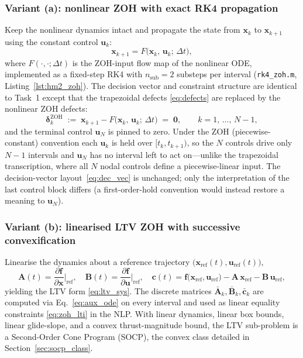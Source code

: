 \documentclass[../main.tex]{subfiles}
\begin{document}
\subsubsection*{Variant (a): nonlinear ZOH with exact RK4 propagation}

Keep the nonlinear dynamics intact and propagate the state from $\mathbf{x}_k$ to $\mathbf{x}_{k+1}$ using the constant control $\mathbf{u}_k$:
\begin{equation}
    \mathbf{x}_{k+1} = F\bigl(\mathbf{x}_k,\,\mathbf{u}_k;\,\Delta t\bigr),
    \label{eq:zoh_nonlinear}
\end{equation}
where $F(\cdot,\cdot;\Delta t)$ is the ZOH-input flow map of the nonlinear ODE, implemented as a fixed-step RK4 with $n_{\mathrm{sub}} = 2$ substeps per interval (\texttt{rk4\_zoh.m}, Listing~\ref{lst:hm2_zoh}). The decision vector and constraint structure are identical to Task~1 except that the trapezoidal defects \eqref{eq:defects} are replaced by the nonlinear ZOH defects:
\begin{equation}
    \boldsymbol{\delta}_k^{\mathrm{ZOH}} \;:=\; \mathbf{x}_{k+1} - F\bigl(\mathbf{x}_k,\,\mathbf{u}_k;\,\Delta t\bigr) \;=\; \mathbf{0},
    \qquad k = 1,\,\ldots,\,N-1,
    \label{eq:zoh_defects}
\end{equation}
and the terminal control $\mathbf{u}_N$ is pinned to zero. Under the ZOH (piecewise-constant) convention each $\mathbf{u}_k$ is held over $[t_k, t_{k+1})$, so the $N$ controls drive only $N-1$ intervals and $\mathbf{u}_N$ has no interval left to act on---unlike the trapezoidal transcription, where all $N$ nodal controls define a piecewise-linear input. The decision-vector layout~\eqref{eq:dec_vec} is unchanged; only the interpretation of the last control block differs (a first-order-hold convention would instead restore a meaning to $\mathbf{u}_N$).

\subsubsection*{Variant (b): linearised LTV ZOH with successive convexification}

Linearise the dynamics about a reference trajectory $\bigl(\mathbf{x}_{\mathrm{ref}}(t), \mathbf{u}_{\mathrm{ref}}(t)\bigr)$,
\begin{equation}
    \mathbf{A}(t) = \frac{\partial \mathbf{f}}{\partial \mathbf{x}}\bigg|_{\mathrm{ref}},\quad
    \mathbf{B}(t) = \frac{\partial \mathbf{f}}{\partial \mathbf{u}}\bigg|_{\mathrm{ref}},\quad
    \mathbf{c}(t) = \mathbf{f}\bigl(\mathbf{x}_{\mathrm{ref}},\mathbf{u}_{\mathrm{ref}}\bigr) - \mathbf{A}\,\mathbf{x}_{\mathrm{ref}} - \mathbf{B}\,\mathbf{u}_{\mathrm{ref}},
\end{equation}
yielding the LTV form \eqref{eq:ltv_sys}. The discrete matrices $\bar{\mathbf{A}}_k,\bar{\mathbf{B}}_k,\bar{\mathbf{c}}_k$ are computed via Eq.~\eqref{eq:aux_ode} on every interval and used as linear equality constraints \eqref{eq:zoh_lti} in the NLP. With linear dynamics, linear box bounds, linear glide-slope, and a convex thrust-magnitude bound, the LTV sub-problem is a Second-Order Cone Program (SOCP), the convex class detailed in Section~\ref{sec:socp_class}.
\end{document}
